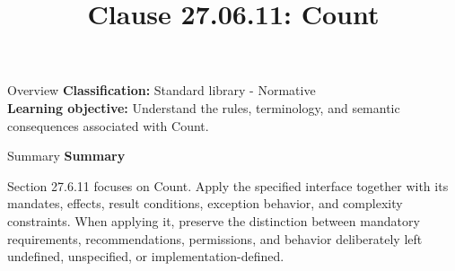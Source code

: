 \documentclass[10pt,letterpaper]{article}
\title{Clause 27.06.11: Count}
\author{}
\date{}
\begin{document}
\maketitle
\begin{CornellOverviewBox}{Overview}
\textbf{Classification:} Standard library - Normative\\[2pt]
\textbf{Learning objective:} Understand the rules, terminology, and semantic consequences associated with Count.
\end{CornellOverviewBox}\begin{CornellSummaryBox}{Summary}
{\sffamily\bfseries\color{Accent} Summary}\par\vspace{3pt}Section 27.6.11 focuses on Count. Apply the specified interface together with its mandates, effects, result conditions, exception behavior, and complexity constraints. When applying it, preserve the distinction between mandatory requirements, recommendations, permissions, and behavior deliberately left undefined, unspecified, or implementation-defined.
\end{CornellSummaryBox}
\end{document}
